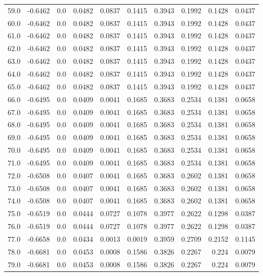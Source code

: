 \begin{longtable}{lrrrrrrrrr}
59.0 & -0.6462 & 0.0 & 0.0482 & 0.0837 & 0.1415 & 0.3943 & 0.1992 & 0.1428 & 0.0437 \\
60.0 & -0.6462 & 0.0 & 0.0482 & 0.0837 & 0.1415 & 0.3943 & 0.1992 & 0.1428 & 0.0437 \\
61.0 & -0.6462 & 0.0 & 0.0482 & 0.0837 & 0.1415 & 0.3943 & 0.1992 & 0.1428 & 0.0437 \\
62.0 & -0.6462 & 0.0 & 0.0482 & 0.0837 & 0.1415 & 0.3943 & 0.1992 & 0.1428 & 0.0437 \\
63.0 & -0.6462 & 0.0 & 0.0482 & 0.0837 & 0.1415 & 0.3943 & 0.1992 & 0.1428 & 0.0437 \\
64.0 & -0.6462 & 0.0 & 0.0482 & 0.0837 & 0.1415 & 0.3943 & 0.1992 & 0.1428 & 0.0437 \\
65.0 & -0.6462 & 0.0 & 0.0482 & 0.0837 & 0.1415 & 0.3943 & 0.1992 & 0.1428 & 0.0437 \\
66.0 & -0.6495 & 0.0 & 0.0409 & 0.0041 & 0.1685 & 0.3683 & 0.2534 & 0.1381 & 0.0658 \\
67.0 & -0.6495 & 0.0 & 0.0409 & 0.0041 & 0.1685 & 0.3683 & 0.2534 & 0.1381 & 0.0658 \\
68.0 & -0.6495 & 0.0 & 0.0409 & 0.0041 & 0.1685 & 0.3683 & 0.2534 & 0.1381 & 0.0658 \\
69.0 & -0.6495 & 0.0 & 0.0409 & 0.0041 & 0.1685 & 0.3683 & 0.2534 & 0.1381 & 0.0658 \\
70.0 & -0.6495 & 0.0 & 0.0409 & 0.0041 & 0.1685 & 0.3683 & 0.2534 & 0.1381 & 0.0658 \\
71.0 & -0.6495 & 0.0 & 0.0409 & 0.0041 & 0.1685 & 0.3683 & 0.2534 & 0.1381 & 0.0658 \\
72.0 & -0.6508 & 0.0 & 0.0407 & 0.0041 & 0.1685 & 0.3683 & 0.2602 & 0.1381 & 0.0658 \\
73.0 & -0.6508 & 0.0 & 0.0407 & 0.0041 & 0.1685 & 0.3683 & 0.2602 & 0.1381 & 0.0658 \\
74.0 & -0.6508 & 0.0 & 0.0407 & 0.0041 & 0.1685 & 0.3683 & 0.2602 & 0.1381 & 0.0658 \\
75.0 & -0.6519 & 0.0 & 0.0444 & 0.0727 & 0.1078 & 0.3977 & 0.2622 & 0.1298 & 0.0387 \\
76.0 & -0.6519 & 0.0 & 0.0444 & 0.0727 & 0.1078 & 0.3977 & 0.2622 & 0.1298 & 0.0387 \\
77.0 & -0.6658 & 0.0 & 0.0434 & 0.0013 & 0.0019 & 0.3959 & 0.2709 & 0.2152 & 0.1145 \\
78.0 & -0.6681 & 0.0 & 0.0453 & 0.0008 & 0.1586 & 0.3826 & 0.2267 & 0.224 & 0.0079 \\
79.0 & -0.6681 & 0.0 & 0.0453 & 0.0008 & 0.1586 & 0.3826 & 0.2267 & 0.224 & 0.0079 \\

\end{longtable}
